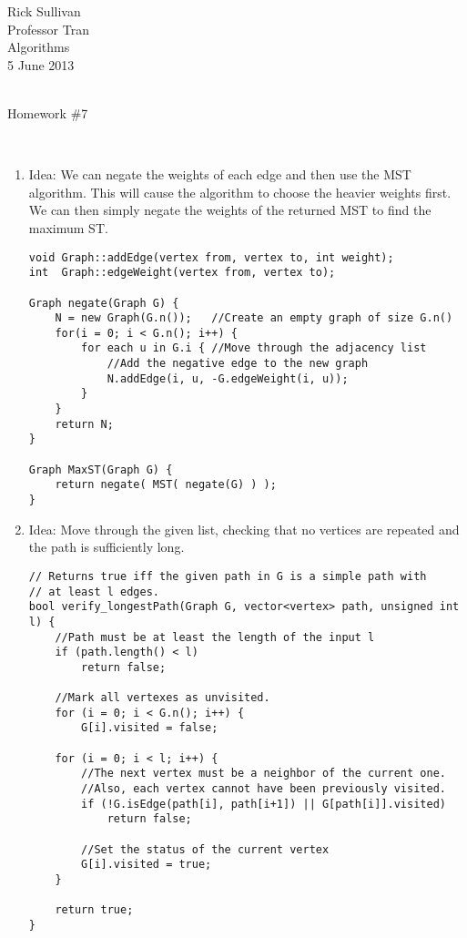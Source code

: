 \documentclass[11pt]{article}
\begin{document}
\noindent   Rick Sullivan \\
            Professor Tran  \\
            Algorithms  \\
            5 June 2013 \\
            \\
\centerline{Homework \#7}   \\
\begin{enumerate}
    \item
        Idea: We can negate the weights of each edge and then use the MST 
        algorithm. This will cause the algorithm to choose the heavier 
        weights first. We can then simply negate the weights of the returned
        MST to find the maximum ST.\\
\begin{lstlisting}
void Graph::addEdge(vertex from, vertex to, int weight);
int  Graph::edgeWeight(vertex from, vertex to);

Graph negate(Graph G) {
    N = new Graph(G.n());   //Create an empty graph of size G.n()
    for(i = 0; i < G.n(); i++) {
        for each u in G.i { //Move through the adjacency list
            //Add the negative edge to the new graph
            N.addEdge(i, u, -G.edgeWeight(i, u));
        }
    }
    return N;
}

Graph MaxST(Graph G) {
    return negate( MST( negate(G) ) );
}
\end{lstlisting} 
    \item
        Idea: Move through the given list, checking that no vertices
        are repeated and the path is sufficiently long.\\
\begin{lstlisting}
// Returns true iff the given path in G is a simple path with 
// at least l edges.
bool verify_longestPath(Graph G, vector<vertex> path, unsigned int l) {
    //Path must be at least the length of the input l
    if (path.length() < l)
        return false;

    //Mark all vertexes as unvisited.
    for (i = 0; i < G.n(); i++) {
        G[i].visited = false;

    for (i = 0; i < l; i++) {
        //The next vertex must be a neighbor of the current one.
        //Also, each vertex cannot have been previously visited.
        if (!G.isEdge(path[i], path[i+1]) || G[path[i]].visited) 
            return false;

        //Set the status of the current vertex
        G[i].visited = true;
    }
    
    return true;
}
\end{lstlisting}
\end{enumerate}
\end{document}
